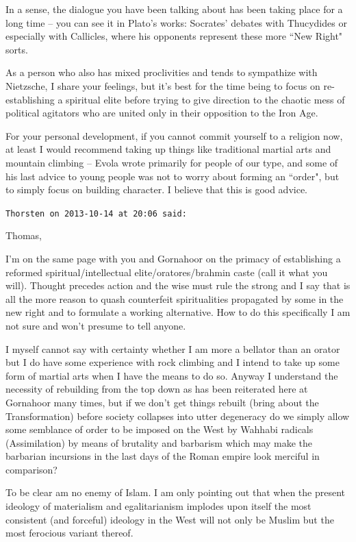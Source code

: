 \begin{footnotesize}
\begin{sffamily}
In a sense, the dialogue you have been talking about has been taking place for a long time – you can see it in
Plato's works: Socrates' debates with Thucydides or especially with
Callicles, where his opponents represent these more ``New Right" sorts.

As a person who also has mixed proclivities and tends to sympathize with Nietzsche, I share your feelings, but
it's best for the time being to focus on re-establishing a spiritual elite before trying to give
direction to the chaotic mess of political agitators who are united only in their opposition to the Iron Age.

For your personal development, if you cannot commit yourself to a religion now, at least I would recommend taking up
things like traditional martial arts and mountain climbing – Evola wrote primarily for people of our type, and some of
his last advice to young people was not to worry about forming an ``order", but to simply focus on building character. I
believe that this is good advice.


\hfill

\texttt{Thorsten on 2013-10-14 at 20:06 said: }

Thomas,

I'm on the same page with you and Gornahoor on the primacy of establishing a reformed
spiritual/intellectual elite/oratores/brahmin caste (call it what you will). Thought precedes action and the wise must
rule the strong and I say that is all the more reason to quash counterfeit spiritualities propagated by some in the new
right and to formulate a working alternative. How to do this specifically I am not sure and won't
presume to tell anyone.

I myself cannot say with certainty whether I am more a bellator than an orator but I do have some experience with rock
climbing and I intend to take up some form of martial arts when I have the means to do so. Anyway I understand the
necessity of rebuilding from the top down as has been reiterated here at Gornahoor many times, but if we
don't get things rebuilt (bring about the Transformation) before society collapses into utter
degeneracy do we simply allow some semblance of order to be imposed on the West by Wahhabi radicals (Assimilation) by
means of brutality and barbarism which may make the barbarian incursions in the last days of the Roman empire look
merciful in comparison?

To be clear am no enemy of Islam. I am only pointing out that when the present ideology of materialism and
egalitarianism implodes upon itself the most consistent (and forceful) ideology in the West will not only be Muslim but
the most ferocious variant thereof.



\end{sffamily}
\end{footnotesize}
